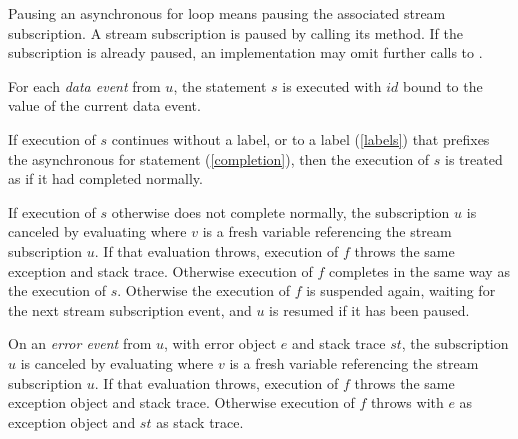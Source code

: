 \documentclass{article}
\begin{document}
Pausing an asynchronous for loop means pausing the associated stream subscription.
A stream subscription is paused by calling its  method.
If the subscription is already paused, an implementation may omit further calls to .


\LMHash{}
For each {\em data event} from $u$,
the statement $s$ is executed with $id$ bound to the value of the current data event.


\LMHash{}
If execution of $s$ continues without a label, or to a label (\ref{labels}) that prefixes the asynchronous for statement (\ref{completion}), then the execution of $s$ is treated as if it had completed normally.

If execution of $s$ otherwise does not complete normally, the subscription $u$ is canceled by evaluating  where $v$ is a fresh variable referencing the stream subscription $u$.
If that evaluation throws,
execution of $f$ throws the same exception and stack trace.
Otherwise execution of $f$ completes in the same way as the execution of $s$.
Otherwise the execution of $f$ is suspended again, waiting for the next stream subscription event, and $u$ is resumed if it has been paused.

\LMHash{}
On an {\em error event} from $u$,
with error object $e$ and stack trace $st$,
the subscription $u$ is canceled by evaluating 
where $v$ is a fresh variable referencing the stream subscription $u$.
If that evaluation throws,
execution of $f$ throws the same exception object and stack trace.
Otherwise execution of $f$ throws with $e$ as exception object and $st$ as stack trace.
\end{document}
